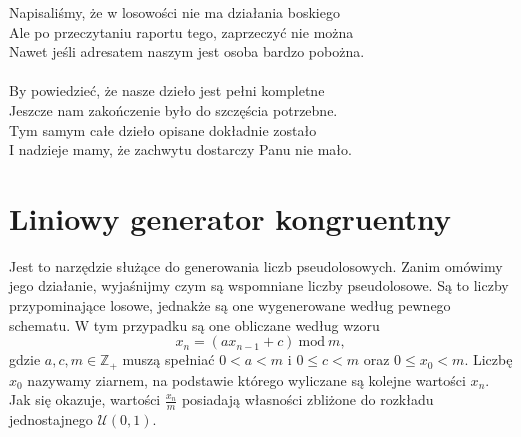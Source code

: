 \documentclass[12pt]{mwrep}
\begin{document}
	Napisaliśmy, że w losowości nie ma działania boskiego\\
	Ale po przeczytaniu raportu tego, zaprzeczyć nie można\\
	Nawet jeśli adresatem naszym jest osoba bardzo pobożna.\\
	\\
	By powiedzieć, że nasze dzieło jest pełni kompletne\\
	Jeszcze nam zakończenie było do szczęścia potrzebne.\\
	Tym samym całe dzieło opisane dokładnie zostało\\
	I nadzieje mamy, że zachwytu dostarczy Panu nie mało.\\

	
	

	
	
	
	
	
	
	



	\section{Liniowy generator kongruentny}
	\noindent Jest to narzędzie służące do generowania liczb pseudolosowych. Zanim omówimy jego działanie, wyjaśnijmy czym są wspomniane liczby pseudolosowe. Są to liczby przypominające losowe, jednakże są one wygenerowane według pewnego schematu. W tym przypadku są one obliczane według wzoru
	$$ x_n = (ax_{n-1} + c)\ \mathrm{mod}\ m, $$
	gdzie $a, c, m \in \mathbb{Z}_+$ muszą spełniać $0 < a < m$ i $0 \leq c < m$ oraz  $0 \leq x_0 < m$. Liczbę $x_0$ nazywamy ziarnem, na podstawie którego wyliczane są kolejne wartości $x_n$. Jak się okazuje, wartości $\frac{x_n}{m}$ posiadają własności zbliżone do rozkładu jednostajnego $\mathcal{U}(0, 1)$.
	
\end{document}
